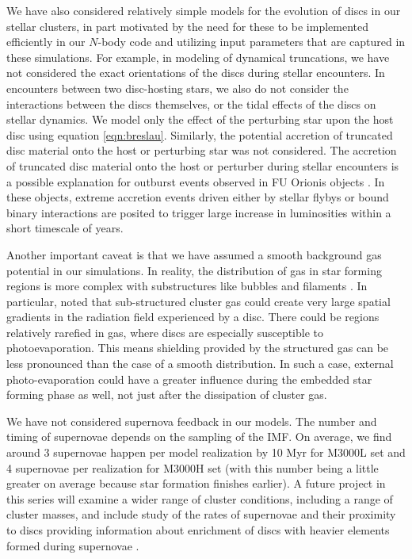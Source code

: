 \documentclass[fleqn,usenatbib]{mnras}
\begin{document}
We have also considered relatively simple models for the evolution of discs in our stellar clusters, in part motivated by the need for these to be implemented efficiently in our $N$-body code and utilizing input parameters that are captured in these simulations. For example, in modeling of dynamical truncations, we have not considered the exact orientations of the discs during stellar encounters. In encounters between two disc-hosting stars, we also do not consider the interactions between the discs themselves, or the tidal effects of the discs on stellar dynamics. We model only the effect of the perturbing star upon the host disc using equation \ref{eqn:breslau}. Similarly, the potential accretion of truncated disc material onto the host or perturbing star was not considered. The accretion of truncated disc material onto the host or perturber during stellar encounters is a possible explanation for outburst events observed in FU Orionis objects \citep{Cuello2022arXiv220709752C}. In these objects, extreme accretion events driven either by stellar flybys \citep{Borchert2022MNRAS.517.4436B} or bound binary interactions \citep{Bonnell1992ApJ...401L..31B} are posited to trigger large increase in luminosities within a short timescale of years. 

Another important caveat is that we have assumed a smooth background gas potential in our simulations. In reality, the distribution of gas in star forming regions is more complex with substructures like bubbles and filaments \citep{Hacar2022arXiv220309562H}. In particular, \cite{Wilhelm2023arXiv230203721W} noted that sub-structured cluster gas could create very large spatial gradients in the radiation field experienced by a disc. There could be regions relatively rarefied in gas, where discs are especially susceptible to photoevaporation. This means shielding provided by the structured gas can be less pronounced than the case of a smooth distribution. In such a case, external photo-evaporation could have a greater influence during the embedded star forming phase as well, not just after the dissipation of cluster gas.   

We have not considered supernova feedback in our models. The number and timing of supernovae depends on the sampling of the IMF. On average, we find around 3 supernovae happen per model realization by 10 Myr for M3000L set and 4 supernovae per realization for M3000H set (with this number being a little greater on average because star formation finishes earlier). A future project in this series will examine a wider range of cluster conditions, including a range of cluster masses, and include study of the rates of supernovae and their proximity to discs providing information about enrichment of discs with heavier elements formed during supernovae \citep{Williams2007ApJ...663L..33W,Gounelle2008ApJ...680..781G}. 
\end{document}
